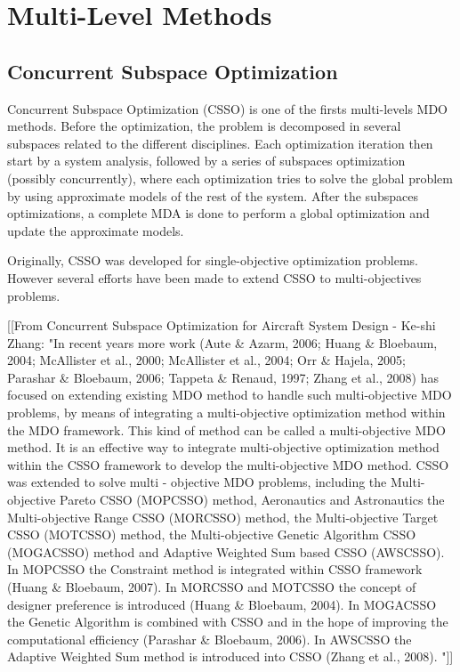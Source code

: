 \section{Multi-Level Methods}

\subsection{Concurrent Subspace Optimization}

Concurrent Subspace Optimization (CSSO) is one of the firsts multi-levels MDO methods. Before the optimization, the problem is decomposed in several subspaces related to the different disciplines. Each optimization iteration then start by a system analysis, followed by a series of subspaces optimization (possibly concurrently), where each optimization tries to solve the global problem by using approximate models of the rest of the system. After the subspaces optimizations, a complete MDA is done to perform a global optimization and update the approximate models.

Originally, CSSO was developed for single-objective optimization problems. However several efforts have been made to extend CSSO to multi-objectives problems.

[[From Concurrent Subspace Optimization for Aircraft System Design -  Ke-shi Zhang:
"In recent years more work (Aute \& Azarm, 2006; Huang \& Bloebaum, 2004; McAllister et al., 2000; McAllister et al., 2004; Orr \& Hajela, 2005; Parashar \& Bloebaum, 2006; Tappeta \& Renaud, 1997; Zhang et al., 2008) has focused on extending existing MDO method to handle such multi-objective MDO problems, by means of integrating a multi-objective optimization method within the MDO framework. This kind of method can be called a multi-objective MDO method.
It is an effective way to integrate multi-objective optimization method within the CSSO framework to develop the multi-objective MDO method. CSSO was extended to solve multi - objective MDO problems, including the Multi-objective Pareto CSSO (MOPCSSO) method, Aeronautics and Astronautics the Multi-objective Range CSSO (MORCSSO) method, the Multi-objective Target CSSO (MOTCSSO) method, the Multi-objective Genetic Algorithm CSSO (MOGACSSO) method and Adaptive Weighted Sum based CSSO (AWSCSSO). In MOPCSSO the Constraint method is integrated within CSSO framework (Huang \& Bloebaum, 2007). In MORCSSO and MOTCSSO the concept of designer preference is introduced (Huang \& Bloebaum, 2004). In MOGACSSO the Genetic Algorithm is combined with CSSO and in the hope of improving the computational efficiency (Parashar \& Bloebaum, 2006). In AWSCSSO the Adaptive Weighted Sum method is introduced into CSSO (Zhang et al., 2008). "]]

